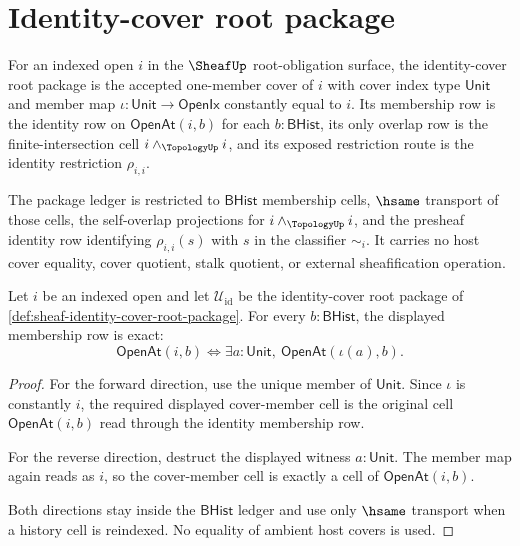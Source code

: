 \section{Identity-cover root package}
\label{sec:sheaf-identity-cover-root-package}

\begin{definition}
\label{def:sheaf-identity-cover-root-package}
For an indexed open $i$ in the $\SheafUp$ root-obligation surface, the identity-cover root package is the accepted one-member cover of $i$ with cover index type $\mathsf{Unit}$ and member map $\iota:\mathsf{Unit}\to\mathsf{OpenIx}$ constantly equal to $i$. Its membership row is the identity row on $\mathsf{OpenAt}(i,b)$ for each $b:\mathsf{BHist}$, its only overlap row is the finite-intersection cell $i\wedge_{\TopologyUp}i$, and its exposed restriction route is the identity restriction $\rho_{i,i}$.

The package ledger is restricted to $\mathsf{BHist}$ membership cells, $\hsame$ transport of those cells, the self-overlap projections for $i\wedge_{\TopologyUp}i$, and the presheaf identity row identifying $\rho_{i,i}(s)$ with $s$ in the classifier $\sim_i$. It carries no host cover equality, cover quotient, stalk quotient, or external sheafification operation.
\end{definition}

\begin{theorem}
\label{thm:sheaf-identity-cover-membership-exactness}
Let $i$ be an indexed open and let $\mathcal{U}_{\mathrm{id}}$ be the identity-cover root package of \autoref{def:sheaf-identity-cover-root-package}. For every $b:\mathsf{BHist}$, the displayed membership row is exact:
$$
\mathsf{OpenAt}(i,b)
\Longleftrightarrow
\exists a:\mathsf{Unit},\ \mathsf{OpenAt}(\iota(a),b).
$$
\end{theorem}
\begin{proof}
For the forward direction, use the unique member of $\mathsf{Unit}$. Since $\iota$ is constantly $i$, the required displayed cover-member cell is the original cell $\mathsf{OpenAt}(i,b)$ read through the identity membership row.

For the reverse direction, destruct the displayed witness $a:\mathsf{Unit}$. The member map again reads as $i$, so the cover-member cell is exactly a cell of $\mathsf{OpenAt}(i,b)$.

Both directions stay inside the $\mathsf{BHist}$ ledger and use only $\hsame$ transport when a history cell is reindexed. No equality of ambient host covers is used.
\end{proof}

